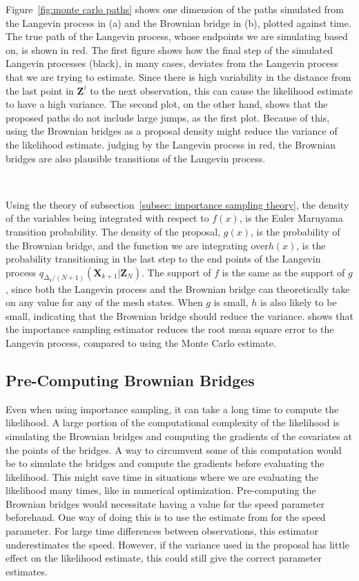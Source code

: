 Figure~\ref{fig:monte carlo paths} shows one dimension of the paths simulated from the Langevin process in (a) and the Brownian bridge in (b), plotted against time. The true path of the Langevin process, whose endpoints we are simulating based on, is shown in red. The first figure shows how the final step of the simulated Langevin processes (black), in many cases, deviates from the Langevin process that we are trying to estimate. Since there is high variability in the distance from the last point in $\textbf{Z}^i$ to the next observation, this can cause the likelihood estimate to have a high variance. The second plot, on the other hand, shows that the proposed paths do not include large jumps, as the first plot. Because of this, using the Brownian bridges as a proposal density might reduce the variance of the likelihood estimate. judging by the Langevin process in red, the Brownian bridges are also plausible transitions of the Langevin process. 

\

Using the theory of subsection~\ref{subsec: importance sampling theory}, the density of the variables being integrated with respect to $f(x)$, is the Euler Maruyama transition probability. The density of the proposal, $g(x)$, is the probability of the Brownian bridge, and the function we are integrating over$h(x)$, is the probability transitioning in the last step to the end points of the Langevin process $q_{\Delta_k/(N+1)}(\textbf{X}_{k+1}|\textbf{Z}_N)$. The support of $f$ is the same as the support of $g$, since both the Langevin process and the Brownian bridge can theoretically take on any value for any of the mesh states. When $g$ is small, $h$ is also likely to be small, indicating that the Brownian bridge should reduce the variance. \parencite{durham_numerical_2002}  shows that the importance sampling estimator reduces the root mean square error to the Langevin process, compared to using the Monte Carlo estimate.


\subsection{Pre-Computing Brownian Bridges}
\label{subsec: precomputing brownian bridges}
Even when using importance sampling, it can take a long time to compute the likelihood. A large portion of the computational complexity of the likelihood is simulating the Brownian bridges and computing the gradients of the covariates at the points of the bridges. A way to circumvent some of this computation would be to simulate the bridges and compute the gradients before evaluating the likelihood. This might save time in situations where we are evaluating the likelihood many times, like in numerical optimization. Pre-computing the Brownian bridges would necessitate having a value for the speed parameter beforehand. One way of doing this is to use the estimate from \parencite{michelot_langevin_2019} for the speed parameter. For large time differences between observations, this estimator underestimates the speed. However, if the variance used in the proposal has little effect on the likelihood estimate, this could still give the correct parameter estimates. 





